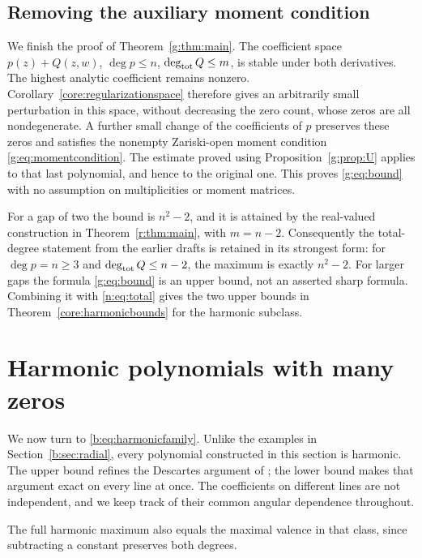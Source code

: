 \documentclass[UTF8,11pt]{ctexart}
\theoremstyle{definition}
\numberwithin{equation}{section}
\begin{document}
\subsection{Removing the auxiliary moment condition}
We finish the proof of Theorem~\ref{g:thm:main}. The coefficient space
$p(z)+Q(z,w)$, $\deg p\le n$, $\deg_{\rm tot}Q\le m$, is stable under
both derivatives. The highest analytic coefficient remains nonzero.
Corollary~\ref{core:regularizationspace} therefore gives an arbitrarily
small perturbation in this space, without decreasing the zero count,
whose zeros are all nondegenerate. A further small change of the
coefficients of $p$ preserves these zeros and satisfies the nonempty
Zariski-open moment condition \eqref{g:eq:momentcondition}. The estimate
proved using Proposition~\ref{g:prop:U} applies to that last polynomial,
and hence to the original one. This proves \eqref{g:eq:bound} with no
assumption on multiplicities or moment matrices.

For a gap of two the bound is $n^2-2$, and it is attained by the
real-valued construction in Theorem~\ref{r:thm:main}, with $m=n-2$.
Consequently the total-degree statement from the earlier drafts is
retained in its strongest form: for $\deg p=n\ge3$ and
$\deg_{\rm tot}Q\le n-2$, the maximum is exactly $n^2-2$.
For larger gaps the formula \eqref{g:eq:bound} is an upper bound,
not an asserted sharp formula. Combining it with
\eqref{n:eq:total} gives the two upper bounds in
Theorem~\ref{core:harmonicbounds} for the harmonic subclass.

\section{Harmonic polynomials with many zeros}\label{b:sec:harmonic}

We now turn to \eqref{b:eq:harmonicfamily}. Unlike the examples in
Section~\ref{b:sec:radial}, every polynomial constructed in this
section is harmonic. The upper bound refines the Descartes argument
of \cite[Section~4.1, \av, pp.~8--9]{Lun23}; the lower bound makes
that argument exact on every line at once. The coefficients on
different lines are not independent, and we keep track of their
common angular dependence throughout.

The full harmonic maximum also equals the maximal valence in that class,
since subtracting a constant preserves both degrees.
\end{document}
